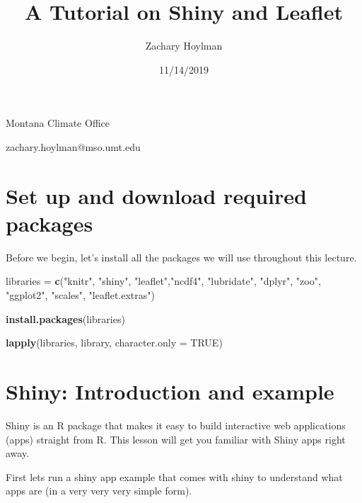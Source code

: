 \documentclass[]{article}
\title{\textbf{A Tutorial on Shiny and Leaflet}}
\author{Zachary Hoylman}
\date{11/14/2019}
\newenvironment{Shaded}{\begin{snugshade}}{\end{snugshade}}
\newcommand{\DataTypeTok}[1]{\textcolor[rgb]{0.13,0.29,0.53}{#1}}
\newcommand{\KeywordTok}[1]{\textcolor[rgb]{0.13,0.29,0.53}{\textbf{#1}}}
\newcommand{\NormalTok}[1]{#1}
\newcommand{\OtherTok}[1]{\textcolor[rgb]{0.56,0.35,0.01}{#1}}
\newcommand{\StringTok}[1]{\textcolor[rgb]{0.31,0.60,0.02}{#1}}
\begin{document}
\maketitle

\begin{center}
Montana Climate Office 
\end{center}
\begin{center}
zachary.hoylman@mso.umt.edu
\end{center}

\hypertarget{set-up-and-download-required-packages}{%
\section{Set up and download required
packages}\label{set-up-and-download-required-packages}}

Before we begin, let's install all the packages we will use throughout
this lecture.

\begin{Shaded}
\begin{Highlighting}[]
\NormalTok{libraries =}\StringTok{ }\KeywordTok{c}\NormalTok{(}\StringTok{"knitr"}\NormalTok{, }\StringTok{"shiny"}\NormalTok{, }\StringTok{"leaflet"}\NormalTok{,}\StringTok{"ncdf4"}\NormalTok{, }\StringTok{"lubridate"}\NormalTok{, }\StringTok{"dplyr"}\NormalTok{,}
                              \StringTok{"zoo"}\NormalTok{, }\StringTok{"ggplot2"}\NormalTok{, }\StringTok{"scales"}\NormalTok{, }\StringTok{"leaflet.extras"}\NormalTok{)}

\KeywordTok{install.packages}\NormalTok{(libraries)}

\KeywordTok{lapply}\NormalTok{(libraries, library, }\DataTypeTok{character.only =} \OtherTok{TRUE}\NormalTok{)}
\end{Highlighting}
\end{Shaded}

\hypertarget{shiny-introduction-and-example}{%
\section{Shiny: Introduction and
example}\label{shiny-introduction-and-example}}

Shiny is an R package that makes it easy to build interactive web
applications (apps) straight from R. This lesson will get you familiar
with Shiny apps right away.

First lets run a shiny app example that comes with shiny to understand
what apps are (in a very very very simple form).
\end{document}
